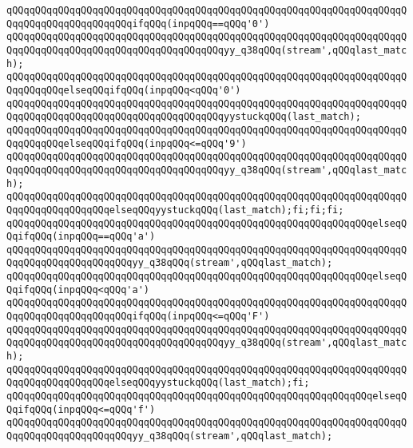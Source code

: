 \verb|qQQqqQQqqQQqqQQqqQQqqQQqqQQqqQQqqQQqqQQqqQQqqQQqqQQqqQQqqQQqqQQqqQQqqQQqqQQqqQQqqQQqqQQqqQQqifqQQq(inpqQQq==qQQq'0')|\newline
\verb|qQQqqQQqqQQqqQQqqQQqqQQqqQQqqQQqqQQqqQQqqQQqqQQqqQQqqQQqqQQqqQQqqQQqqQQqqQQqqQQqqQQqqQQqqQQqqQQqqQQqqQQqqQQqyy_q38qQQq(stream',qQQqlast_match);|\newline
\verb|qQQqqQQqqQQqqQQqqQQqqQQqqQQqqQQqqQQqqQQqqQQqqQQqqQQqqQQqqQQqqQQqqQQqqQQqqQQqqQQqelseqQQqifqQQq(inpqQQq<qQQq'0')|\newline
\verb|qQQqqQQqqQQqqQQqqQQqqQQqqQQqqQQqqQQqqQQqqQQqqQQqqQQqqQQqqQQqqQQqqQQqqQQqqQQqqQQqqQQqqQQqqQQqqQQqqQQqqQQqqQQqyystuckqQQq(last_match);|\newline
\verb|qQQqqQQqqQQqqQQqqQQqqQQqqQQqqQQqqQQqqQQqqQQqqQQqqQQqqQQqqQQqqQQqqQQqqQQqqQQqqQQqelseqQQqifqQQq(inpqQQq<=qQQq'9')|\newline
\verb|qQQqqQQqqQQqqQQqqQQqqQQqqQQqqQQqqQQqqQQqqQQqqQQqqQQqqQQqqQQqqQQqqQQqqQQqqQQqqQQqqQQqqQQqqQQqqQQqqQQqqQQqqQQqyy_q38qQQq(stream',qQQqlast_match);|\newline
\verb|qQQqqQQqqQQqqQQqqQQqqQQqqQQqqQQqqQQqqQQqqQQqqQQqqQQqqQQqqQQqqQQqqQQqqQQqqQQqqQQqqQQqqQQqelseqQQqyystuckqQQq(last_match);fi;fi;fi;|\newline
\verb|qQQqqQQqqQQqqQQqqQQqqQQqqQQqqQQqqQQqqQQqqQQqqQQqqQQqqQQqqQQqqQQqelseqQQqifqQQq(inpqQQq==qQQq'a')|\newline
\verb|qQQqqQQqqQQqqQQqqQQqqQQqqQQqqQQqqQQqqQQqqQQqqQQqqQQqqQQqqQQqqQQqqQQqqQQqqQQqqQQqqQQqqQQqqQQqyy_q38qQQq(stream',qQQqlast_match);|\newline
\verb|qQQqqQQqqQQqqQQqqQQqqQQqqQQqqQQqqQQqqQQqqQQqqQQqqQQqqQQqqQQqqQQqelseqQQqifqQQq(inpqQQq<qQQq'a')|\newline
\verb|qQQqqQQqqQQqqQQqqQQqqQQqqQQqqQQqqQQqqQQqqQQqqQQqqQQqqQQqqQQqqQQqqQQqqQQqqQQqqQQqqQQqqQQqqQQqifqQQq(inpqQQq<=qQQq'F')|\newline
\verb|qQQqqQQqqQQqqQQqqQQqqQQqqQQqqQQqqQQqqQQqqQQqqQQqqQQqqQQqqQQqqQQqqQQqqQQqqQQqqQQqqQQqqQQqqQQqqQQqqQQqqQQqqQQqyy_q38qQQq(stream',qQQqlast_match);|\newline
\verb|qQQqqQQqqQQqqQQqqQQqqQQqqQQqqQQqqQQqqQQqqQQqqQQqqQQqqQQqqQQqqQQqqQQqqQQqqQQqqQQqqQQqqQQqelseqQQqyystuckqQQq(last_match);fi;|\newline
\verb|qQQqqQQqqQQqqQQqqQQqqQQqqQQqqQQqqQQqqQQqqQQqqQQqqQQqqQQqqQQqqQQqelseqQQqifqQQq(inpqQQq<=qQQq'f')|\newline
\verb|qQQqqQQqqQQqqQQqqQQqqQQqqQQqqQQqqQQqqQQqqQQqqQQqqQQqqQQqqQQqqQQqqQQqqQQqqQQqqQQqqQQqqQQqqQQqyy_q38qQQq(stream',qQQqlast_match);|\newline
